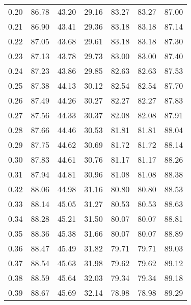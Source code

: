 \begin{tabular}{|c|c|c|c|c|c|c|}
      0.20 &     86.78 &     43.20 &      29.16 &   83.27 &      83.27 &         87.00 \\
      0.21 &     86.90 &     43.41 &      29.36 &   83.18 &      83.18 &         87.14 \\
      0.22 &     87.05 &     43.68 &      29.61 &   83.18 &      83.18 &         87.30 \\
      0.23 &     87.13 &     43.78 &      29.73 &   83.00 &      83.00 &         87.40 \\
      0.24 &     87.23 &     43.86 &      29.85 &   82.63 &      82.63 &         87.53 \\
      0.25 &     87.38 &     44.13 &      30.12 &   82.54 &      82.54 &         87.70 \\
      0.26 &     87.49 &     44.26 &      30.27 &   82.27 &      82.27 &         87.83 \\
      0.27 &     87.56 &     44.33 &      30.37 &   82.08 &      82.08 &         87.91 \\
      0.28 &     87.66 &     44.46 &      30.53 &   81.81 &      81.81 &         88.04 \\
      0.29 &     87.75 &     44.62 &      30.69 &   81.72 &      81.72 &         88.14 \\
      0.30 &     87.83 &     44.61 &      30.76 &   81.17 &      81.17 &         88.26 \\
      0.31 &     87.94 &     44.81 &      30.96 &   81.08 &      81.08 &         88.38 \\
      0.32 &     88.06 &     44.98 &      31.16 &   80.80 &      80.80 &         88.53 \\
      0.33 &     88.14 &     45.05 &      31.27 &   80.53 &      80.53 &         88.63 \\
      0.34 &     88.28 &     45.21 &      31.50 &   80.07 &      80.07 &         88.81 \\
      0.35 &     88.36 &     45.38 &      31.66 &   80.07 &      80.07 &         88.89 \\
      0.36 &     88.47 &     45.49 &      31.82 &   79.71 &      79.71 &         89.03 \\
      0.37 &     88.54 &     45.63 &      31.98 &   79.62 &      79.62 &         89.12 \\
      0.38 &     88.59 &     45.64 &      32.03 &   79.34 &      79.34 &         89.18 \\
      0.39 &     88.67 &     45.69 &      32.14 &   78.98 &      78.98 &         89.29 \\

\end{tabular}
